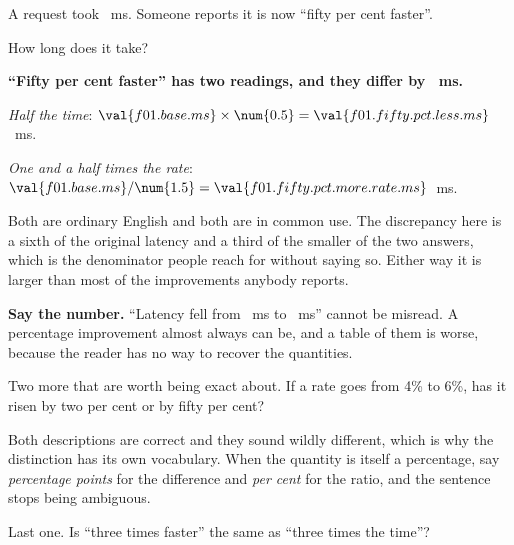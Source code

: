 \begin{fr}
A request took ~ms. Someone reports it is now
\enquote{fifty per cent faster}.

How long does it take?
\nextframe
\end{fr}

\begin{fr}
\begin{trapbox}
\textbf{\enquote{Fifty per cent faster} has two readings, and they differ by
~ms.}

\emph{Half the time}: $\val{f01.base.ms} \times \num{0.5} =
\val{f01.fifty.pct.less.ms}$~ms.

\emph{One and a half times the rate}: $\val{f01.base.ms} / \num{1.5} =
\val{f01.fifty.pct.more.rate.ms}$~ms.

Both are ordinary English and both are in common use. The discrepancy here is
a sixth of the original latency \dash{} and a third of the smaller of the two
answers, which is the denominator people reach for without saying so. Either
way it is larger than most of the improvements anybody reports.

\textbf{Say the number.} \enquote{Latency fell from ~ms to
~ms} cannot be misread. A percentage improvement
almost always can be, and a table of them is worse, because the reader has no
way to recover the quantities.
\end{trapbox}
Two more that are worth being exact about. If a rate goes from 4\% to 6\%, has
it risen by two per cent or by fifty per cent?
\nextframe
\end{fr}

\begin{fr}
Both descriptions are correct and they sound wildly different, which is why the
distinction has its own vocabulary. When the quantity is itself a percentage,
say \emph{percentage points} for the difference and \emph{per cent} for the
ratio, and the sentence stops being ambiguous.

Last one. Is \enquote{three times faster} the same as \enquote{three times the
time}?
\nextframe
\end{fr}

